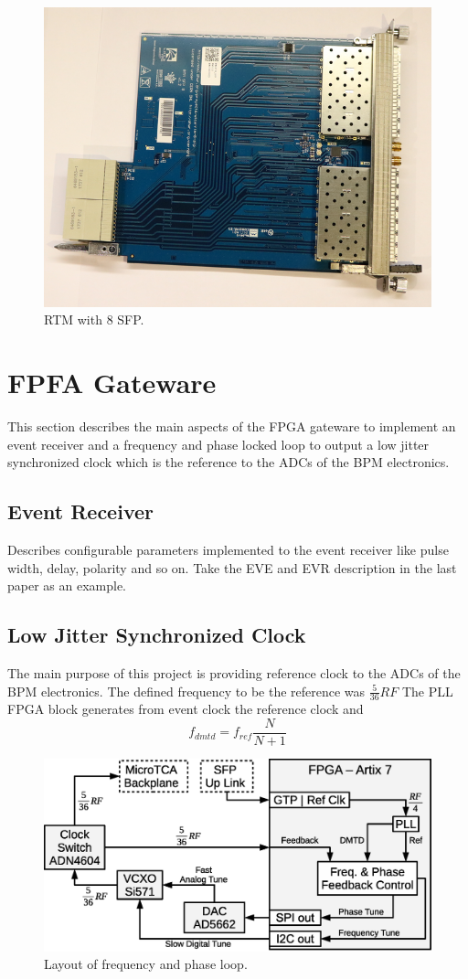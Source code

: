 \documentclass[a4paper,
               biblatex,      %
               ]{jacow}
\begin{document}
\begin{figure}[!htb]
   \centering
   \includegraphics*[width=0.8\columnwidth]{RTM_SFP_resized}
   \caption{RTM with 8 SFP.}
   \label{fig:rtm_sfp}
\end{figure}

\section{FPFA Gateware}

This section describes the main aspects of the FPGA gateware to implement an event receiver and a frequency and phase locked loop to output a low jitter synchronized clock which is the reference to the ADCs of the BPM electronics.

\subsection{Event Receiver}

Describes configurable parameters implemented to the event receiver like pulse width, delay, polarity and so on. Take the EVE and EVR description in the last paper as an example.

\subsection{Low Jitter Synchronized Clock}
The main purpose of this project is providing reference clock to the ADCs of the BPM electronics. The defined frequency to be the reference was $\frac{5}{36}RF$
The PLL FPGA block generates from event clock the reference clock and  
\[f_{dmtd} = f_{ref}\frac{N}{N+1}\]

\begin{figure}[!htb]
   \centering
   \includegraphics*[width=0.8\columnwidth]{AFCRefClockLoop}
   \caption{Layout of frequency and phase loop.}
   \label{fig:AFCRefClockLoop}
\end{figure}
\end{document}
